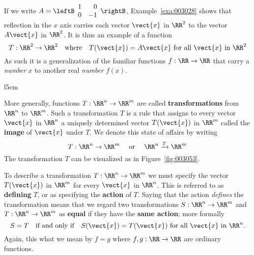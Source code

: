 If we write $A = \leftB \begin{array}{rr}
1 & 0 \\
0 & -1
\end{array} \rightB$, Example~\ref{exa:003028} shows that reflection in the $x$ axis carries each vector $\vect{x}$ in $\RR^2$ to the vector $A\vect{x}$ in $\RR^2$. It is thus an example of a function
\begin{equation*}
T : \RR^{2} \to \RR^{2} \quad \mbox{where} \quad T(\vect{x}) = A\vect{x} \mbox{ for all } \vect{x} \mbox{ in } \RR^{2}
\end{equation*}
As such it is a generalization of the familiar functions $f : \RR \to \RR$ that carry a \textit{number} $x$ to another real \textit{number} $f(x)$.


\begin{wrapfigure}{l}{5cm}
	\centering
	
	\caption{\label{fig:003053}}
\end{wrapfigure}
More generally, functions $T : \RR^n \to \RR^m$ are called \textbf{transformations} from $\RR^n$ to $\RR^m$. Such a transformation $T$ is a rule that assigns to every vector $\vect{x}$ in $\RR^n$ a uniquely determined vector $T(\vect{x})$ in $\RR^m$ called the \textbf{image} of $\vect{x}$ under $T$. We denote this state of affairs by writing
\begin{equation*}
T : \RR^{n} \to \RR^{m} \quad \mbox{ or } \quad \RR^{n} \xrightarrow{T} \RR^{m}
\end{equation*}
The transformation $T$ can be visualized as in Figure~\ref{fig:003053}.



To describe a transformation $T : \RR^n \to \RR^m$ we must specify the vector $T(\vect{x})$ in $\RR^m$ for every $\vect{x}$ in $\RR^n$. This is referred to as \textbf{defining} $T$, or as specifying the \textbf{action} of $T$. Saying that the action \textit{defines} the transformation means that we regard two transformations $S : \RR^n \to \RR^m$  and $T : \RR^n  \to \RR^m$  as \textbf{equal} if they have the \textbf{same action}; more formally
\begin{equation*}
S = T \quad \mbox{if and only if} \quad S(\vect{x}) = T(\vect{x}) \mbox{ for all } \vect{x} \mbox{ in } \RR^{n}.
\end{equation*}
Again, this what we mean by $f = g$ where $f, g : \RR \to \RR$ are ordinary functions.


